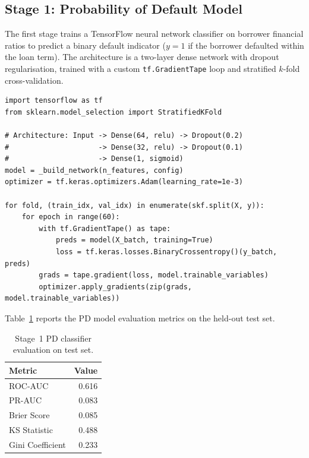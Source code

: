 \documentclass[12pt, a4paper]{article}
\theoremstyle{definition}
\begin{document}
\subsection{Stage 1: Probability of Default Model}

The first stage trains a TensorFlow neural network classifier on borrower financial
ratios to predict a binary default indicator ($y = 1$ if the borrower defaulted
within the loan term).  The architecture is a two-layer dense network with dropout
regularisation, trained with a custom \texttt{tf.GradientTape} loop and stratified
$k$-fold cross-validation.

\begin{lstlisting}[caption={Stage 1 -- TensorFlow PD classifier (excerpt from \texttt{loan\_pricing/models/pd\_model.py}).}, label={lst:pd}]
import tensorflow as tf
from sklearn.model_selection import StratifiedKFold

# Architecture: Input -> Dense(64, relu) -> Dropout(0.2)
#                     -> Dense(32, relu) -> Dropout(0.1)
#                     -> Dense(1, sigmoid)
model = _build_network(n_features, config)
optimizer = tf.keras.optimizers.Adam(learning_rate=1e-3)

for fold, (train_idx, val_idx) in enumerate(skf.split(X, y)):
    for epoch in range(60):
        with tf.GradientTape() as tape:
            preds = model(X_batch, training=True)
            loss = tf.keras.losses.BinaryCrossentropy()(y_batch, preds)
        grads = tape.gradient(loss, model.trainable_variables)
        optimizer.apply_gradients(zip(grads, model.trainable_variables))
\end{lstlisting}

Table~\ref{tab:pd_metrics} reports the PD model evaluation metrics on the held-out
test set.

\begin{table}[htbp]
\centering
\caption{Stage~1 PD classifier evaluation on test set.}
\label{tab:pd_metrics}
\begin{tabular}{lr}
\toprule
Metric & Value \\
\midrule
ROC-AUC            & 0.616 \\
PR-AUC             & 0.083 \\
Brier Score        & 0.085 \\
KS Statistic       & 0.488 \\
Gini Coefficient   & 0.233 \\
\bottomrule
\end{tabular}
\end{table}
\end{document}
